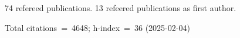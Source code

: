 74 refereed publications. 13 refeered publications as first author.

Total citations~=~4648; h-index~=~36 (2025-02-04)